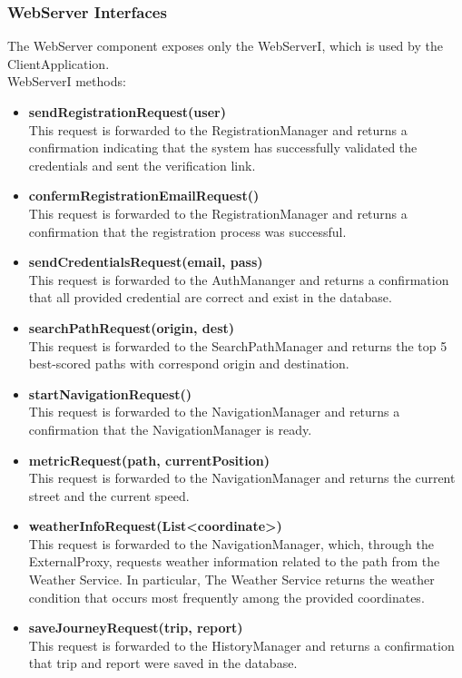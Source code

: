 \subsubsection{WebServer Interfaces}
The WebServer component exposes only the WebServerI, which is used by the ClientApplication.\\
WebServerI methods:
\begin{itemize}
    \item \textbf{sendRegistrationRequest(user)}\\
    This request is forwarded to the RegistrationManager and returns a confirmation indicating that the system has successfully validated the credentials and sent the verification link.
    \item \textbf{confermRegistrationEmailRequest()}\\
    This request is forwarded to the RegistrationManager and returns a confirmation that the registration process was successful.
    \item \textbf{sendCredentialsRequest(email, pass)}\\
    This request is forwarded to the AuthMananger and returns a confirmation that all provided credential are correct and exist in the database.
    \item \textbf{searchPathRequest(origin, dest)}\\
    This request is forwarded to the SearchPathManager and returns the top 5 best-scored paths with correspond origin and destination.
    \item \textbf{startNavigationRequest()}\\
    This request is forwarded to the NavigationManager and returns a confirmation that the NavigationManager is ready.
    \item \textbf{metricRequest(path, currentPosition)}\\
    This request is forwarded to the NavigationManager and returns the current street and the current speed.
    \item \textbf{weatherInfoRequest(List<coordinate>)}\\
    This request is forwarded to the NavigationManager, which, through the ExternalProxy, requests weather information related to the path from the Weather Service. In particular, The Weather Service returns the weather condition that occurs most frequently among the provided coordinates.
    \item \textbf{saveJourneyRequest(trip, report)}\\
    This request is forwarded to the HistoryManager and returns a confirmation that trip and report were saved in the database.

\end{itemize}
